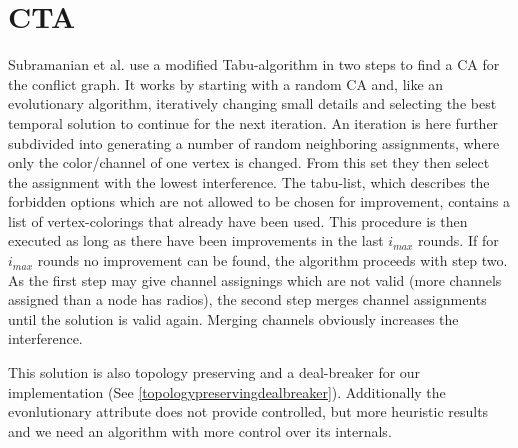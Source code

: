   \section{\ac{CTA}}
    Subramanian et al.\cite{CTA} use a modified Tabu-algorithm \cite{tabu} in two steps to find a \ac{CA} for the conflict graph.
    It works by starting with a random \ac{CA} and, like an evolutionary algorithm, 
    iteratively changing small details and selecting the best temporal solution to continue for the next iteration.
    An iteration is here further subdivided into generating a number of random neighboring assignments, where only the color/channel of one vertex is changed.
    From this set they then select the assignment with the lowest interference.
    The tabu-list, which describes the forbidden options which are not allowed to be chosen for improvement, contains a list of vertex-colorings that already have been used.
    This procedure is then executed as long as there have been improvements in the last \textit{$i_{max}$} rounds.
    If for \textit{$i_{max}$} rounds no improvement can be found, the algorithm proceeds with step two.
    As the first step may give channel assignings which are not valid (more channels assigned than a node has radios), the second step merges channel assignments 
    until the solution is valid again. Merging channels obviously increases the interference.
    
    This solution is also topology preserving and a deal-breaker for our implementation (See \ref{topologypreservingdealbreaker}).
    Additionally the evonlutionary attribute does not provide controlled, but more heuristic results and we need an algorithm with more control over its internals.